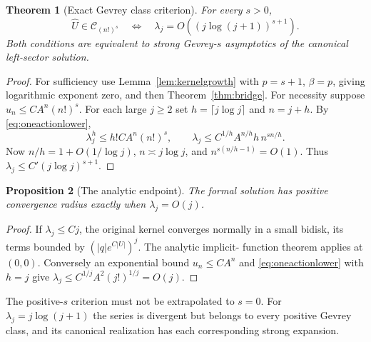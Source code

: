 \documentclass[11pt,a4paper]{article}
\numberwithin{equation}{section}
\newtheorem{theorem}{Theorem}[section]
\newtheorem{proposition}[theorem]{Proposition}
\theoremstyle{definition}\newtheorem{definition}[theorem]{Definition}
\theoremstyle{remark}\newtheorem{remark}[theorem]{Remark}
\newcommand{\Uhat}{\widehat U}\newcommand{\Qhat}{\widehat Q}\newcommand{\Vhat}{\widehat V}
\begin{document}
\begin{theorem}[Exact Gevrey class criterion]
\label{thm:gevrey}
For every $s>0$,
\begin{equation}
 \Uhat\in\mathcal C_{(n!)^s}
 \quad\Longleftrightarrow\quad
 \lambda_j=O((j\log(j+1))^{s+1}).
 \label{eq:gevreycriterion}
\end{equation}
Both conditions are equivalent to strong Gevrey-$s$ asymptotics of the
canonical left-sector solution.
\end{theorem}
\begin{proof}
For sufficiency use Lemma~\ref{lem:kernelgrowth} with $p=s+1$,
$\beta=p$, giving logarithmic exponent zero, and then
Theorem~\ref{thm:bridge}.
For necessity suppose $u_n\le CA^n(n!)^s$. For each large $j\ge2$ set
$h=\lceil j\log j\rceil$ and $n=j+h$. By \eqref{eq:oneactionlower},
\[
 \lambda_j^h\le h!CA^n(n!)^s,
 \qquad
 \lambda_j\le C^{1/h}A^{n/h}h\,n^{sn/h}.
\]
Now $n/h=1+O(1/\log j)$, $n\asymp j\log j$, and
$n^{s(n/h-1)}=O(1)$. Thus
$\lambda_j\le C'(j\log j)^{s+1}$.
\end{proof}

\begin{proposition}[The analytic endpoint]
\label{prop:analytic}
The formal solution has positive convergence radius exactly when
$\lambda_j=O(j)$.
\end{proposition}
\begin{proof}
If $\lambda_j\le Cj$, the original kernel converges normally in a small
bidisk, its terms bounded by $(|q|e^{C|U|})^j$. The analytic implicit-
function theorem applies at $(0,0)$. Conversely an exponential bound
$u_n\le CA^n$ and \eqref{eq:oneactionlower} with $h=j$ give
$\lambda_j\le C^{1/j}A^2(j!)^{1/j}=O(j)$.
\end{proof}
The positive-$s$ criterion must not be extrapolated to $s=0$.
For $\lambda_j=j\log(j+1)$ the series is divergent but belongs to
every positive Gevrey class, and its canonical realization has each
corresponding strong expansion.
\end{document}

